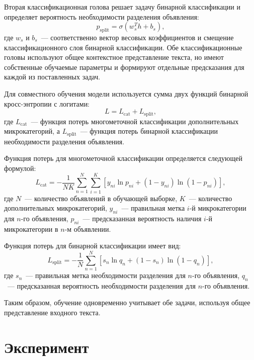 \documentclass{misisarticle}
\begin{document}
Вторая классификационная голова решает задачу бинарной классификации и определяет вероятность необходимости разделения объявления:
\begin{equation}
  p_{\mathrm{split}} = \sigma(w_s^{T}h + b_s),
  \label{eq:binhead}
\end{equation}
где $w_s$ и $b_s$~--- соответственно вектор весовых коэффициентов и смещение классификационного слоя бинарной классификации. Обе классификационные головы используют общее контекстное представление текста, но имеют собственные обучаемые параметры и формируют отдельные предсказания для каждой из поставленных задач.

Для совместного обучения модели используется сумма двух функций бинарной кросс-энтропии с логитами:
\begin{equation}
  L = L_{\mathrm{cat}} + L_{\mathrm{split}},
  \label{eq:total_loss}
\end{equation}
где $L_{\mathrm{cat}}$~--- функция потерь многометочной классификации дополнительных микрокатегорий, а $L_{\mathrm{split}}$~--- функция потерь бинарной классификации необходимости разделения объявления.

Функция потерь для многометочной классификации определяется следующей формулой:
\begin{equation}
  L_{\mathrm{cat}} = -\frac{1}{NK} \sum_{n=1}^{N} \sum_{i=1}^{K} \left[ y_{ni} \ln p_{ni} + (1 - y_{ni}) \ln (1 - p_{ni}) \right],
  \label{eq:loss_cat}
\end{equation}
где $N$~--- количество объявлений в обучающей выборке, $K$~--- количество дополнительных микрокатегорий, $y_{ni}$~--- правильная метка $i$-й микрокатегории для $n$-го объявления, $p_{ni}$~--- предсказанная вероятность наличия $i$-й микрокатегории в $n$-м объявлении.

Функция потерь для бинарной классификации имеет вид:
\begin{equation}
  L_{\mathrm{split}} = -\frac{1}{N} \sum_{n=1}^{N} \left[ s_n \ln q_n + (1 - s_n) \ln (1 - q_n) \right],
  \label{eq:loss_split}
\end{equation}
где $s_n$~--- правильная метка необходимости разделения для $n$-го объявления, $q_n$~--- предсказанная вероятность необходимости разделения для $n$-го объявления.

Таким образом, обучение одновременно учитывает обе задачи, используя общее представление входного текста.

\section{Эксперимент}
\end{document}
